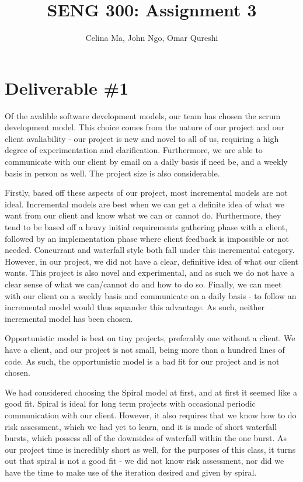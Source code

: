 \documentclass[11pt,a4paper]{article}
\title{\vspace{-2.0cm} \textbf{SENG 300: Assignment 3}}
\author{Celina Ma, John Ngo, Omar Qureshi}
\begin{document}
\maketitle
\def\textfraction{.01}
\def\topfraction{.99}

\section*{Deliverable \#1}

Of the avalible software development models, our team has chosen the scrum development model. This choice comes from the nature of our project and our client avaliability - our project is new and novel to all of us, requiring a high degree of experimentation and clarification. Furthermore, we are able to communicate with our client by email on a daily basis if need be, and a weekly basis in person as well. The project size is also considerable.

Firstly, based off these aspects of our project, most incremental models are not ideal. Incremental models are best when we can get a definite idea of what we want from our client and know what we can or cannot do. Furthermore, they tend to be based off a heavy initial requirements gathering phase with a client, followed by an implementation phase where client feedback is impossible or not needed. Concurrant and waterfall style both fall under this incremental category. However, in our project, we did not have a clear, definitive idea of what our client wants. This project is also novel and experimental, and as such we do not have a clear sense of what we can/cannot do and how to do so. Finally, we can meet with our client on a weekly basis and communicate on a daily basis - to follow an incremental model would thus squander this advantage. As such, neither incremental model has been chosen.

Opportunistic model is best on tiny projects, preferably one without a client. We have a client, and our project is not small, being more than a hundred lines of code. As such, the opportunistic model is a bad fit for our project and is not chosen.

We had considered choosing the Spiral model at first, and at first it seemed like a good fit. Spiral is ideal for long term projects with occasional periodic communication with our client. However, it also requires that we know how to do risk assessment, which we had yet to learn, and it is made of short waterfall bursts, which possess all of the downsides of waterfall within the one burst. As our project time is incredibly short as well, for the purposes of this class, it turns out that spiral is not a good fit - we did not know risk assessment, nor did we have the time to make use of the iteration desired and given by spiral.
\end{document}
